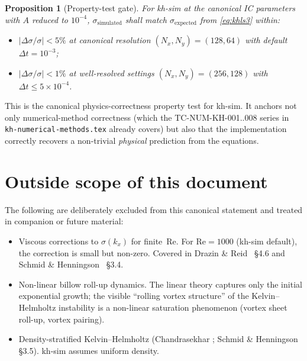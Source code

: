 \documentclass[11pt,a4paper]{article}
\theoremstyle{definition}
\theoremstyle{plain}
\newtheorem{proposition}{Proposition}
\begin{document}
\begin{proposition}[Property-test gate]
For kh-sim at the canonical IC parameters with $A$ reduced to
$10^{-4}$, $\sigma_{\text{simulated}}$ shall match
$\sigma_{\text{expected}}$ from \eqref{eq:khls3} within:
\begin{itemize}
\item $\lvert \Delta\sigma/\sigma \rvert < 5\%$ at canonical
      resolution $(N_x, N_y) = (128, 64)$ with default $\Delta t = 10^{-3}$;
\item $\lvert \Delta\sigma/\sigma \rvert < 1\%$ at well-resolved
      settings $(N_x, N_y) = (256, 128)$ with $\Delta t \leq 5 \times 10^{-4}$.
\end{itemize}
\end{proposition}

This is the canonical physics-correctness property test for kh-sim.
It anchors not only numerical-method correctness (which the
TC-NUM-KH-001..008 series in
\texttt{kh-numerical-methods.tex} already covers) but also that the
implementation correctly recovers a non-trivial \emph{physical}
prediction from the equations.

\section{Outside scope of this document}

The following are deliberately excluded from this canonical statement
and treated in companion or future material:
\begin{itemize}
\item Viscous corrections to $\sigma(k_x)$ for finite~$\mathrm{Re}$.
      For $\mathrm{Re} = 1000$ (kh-sim default), the correction is
      small but non-zero. Covered in
      Drazin \& Reid~\cite{DrazinReid2004} \S 4.6 and Schmid \&
      Henningson~\cite{SchmidHenningson2001} \S 3.4.
\item Non-linear billow roll-up dynamics. The linear theory captures
      only the initial exponential growth; the visible
      ``rolling vortex structure'' of the Kelvin--Helmholtz
      instability is a non-linear saturation phenomenon (vortex sheet
      roll-up, vortex pairing).
\item Density-stratified Kelvin--Helmholtz (Chandrasekhar
      \cite{Chandrasekhar1981}; Schmid \& Henningson \S 3.5).
      kh-sim assumes uniform density.
\end{itemize}

\printbibliography
\end{document}
